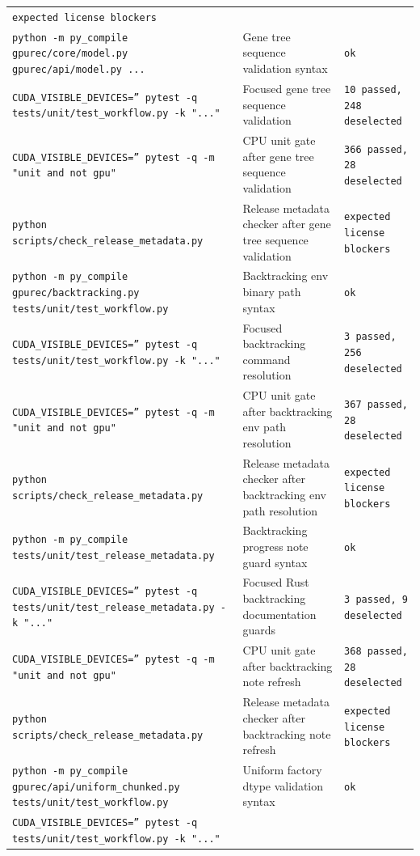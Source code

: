 \documentclass[11pt]{article}
\begin{document}
\begin{center}
\begin{tabular}{lll}
\texttt{expected license blockers} \\
\texttt{python -m py\_compile gpurec/core/model.py gpurec/api/model.py ...} &
Gene tree sequence validation syntax &
\texttt{ok} \\
\texttt{CUDA\_VISIBLE\_DEVICES='' pytest -q tests/unit/test\_workflow.py -k "..."} &
Focused gene tree sequence validation &
\texttt{10 passed, 248 deselected} \\
\texttt{CUDA\_VISIBLE\_DEVICES='' pytest -q -m "unit and not gpu"} &
CPU unit gate after gene tree sequence validation &
\texttt{366 passed, 28 deselected} \\
\texttt{python scripts/check\_release\_metadata.py} &
Release metadata checker after gene tree sequence validation &
\texttt{expected license blockers} \\
\texttt{python -m py\_compile gpurec/backtracking.py tests/unit/test\_workflow.py} &
Backtracking env binary path syntax &
\texttt{ok} \\
\texttt{CUDA\_VISIBLE\_DEVICES='' pytest -q tests/unit/test\_workflow.py -k "..."} &
Focused backtracking command resolution &
\texttt{3 passed, 256 deselected} \\
\texttt{CUDA\_VISIBLE\_DEVICES='' pytest -q -m "unit and not gpu"} &
CPU unit gate after backtracking env path resolution &
\texttt{367 passed, 28 deselected} \\
\texttt{python scripts/check\_release\_metadata.py} &
Release metadata checker after backtracking env path resolution &
\texttt{expected license blockers} \\
\texttt{python -m py\_compile tests/unit/test\_release\_metadata.py} &
Backtracking progress note guard syntax &
\texttt{ok} \\
\texttt{CUDA\_VISIBLE\_DEVICES='' pytest -q tests/unit/test\_release\_metadata.py -k "..."} &
Focused Rust backtracking documentation guards &
\texttt{3 passed, 9 deselected} \\
\texttt{CUDA\_VISIBLE\_DEVICES='' pytest -q -m "unit and not gpu"} &
CPU unit gate after backtracking note refresh &
\texttt{368 passed, 28 deselected} \\
\texttt{python scripts/check\_release\_metadata.py} &
Release metadata checker after backtracking note refresh &
\texttt{expected license blockers} \\
\texttt{python -m py\_compile gpurec/api/uniform\_chunked.py tests/unit/test\_workflow.py} &
Uniform factory dtype validation syntax &
\texttt{ok} \\
\texttt{CUDA\_VISIBLE\_DEVICES='' pytest -q tests/unit/test\_workflow.py -k "..."} &

\end{tabular}
\end{center}
\end{document}
